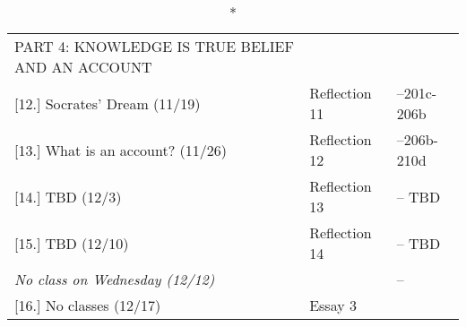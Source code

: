 \documentclass[article,oneside]{memoir}
\begin{document}
\vspace{-1.5cm}
\begin{center}
\begin{longtable}{p{6cm}p{3cm}p{5cm}}
  \caption*{PART 4: KNOWLEDGE IS TRUE BELIEF AND AN ACCOUNT} \\
  			

[12.] Socrates' Dream (11/19)			& Reflection 11		& --201c-206b \\
						
[13.] What is an account? (11/26)	      	& Reflection 12		&  --206b-210d \\ 

[14.] TBD  (12/3)	    				& Reflection 13 	& -- TBD\\ 
			      				
[15.] TBD 	(12/10)			  		& Reflection 14		&-- TBD \\ 
\emph{No class on Wednesday (12/12)}   &	 			&--\\ 

[16.] No classes (12/17)		    		& Essay 3			& \\ 



\end{longtable}
\end{center}



\end{document}
